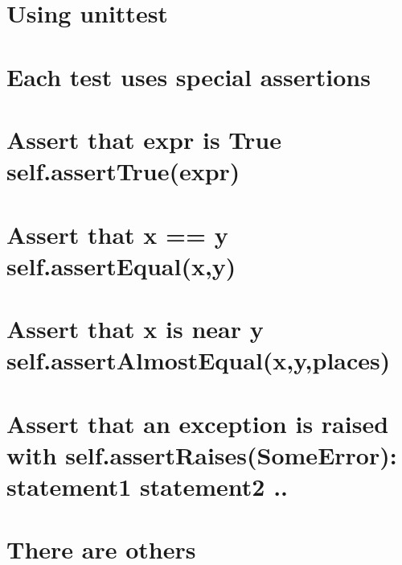 \documentclass[
  letterpaper,
  DIV=11,
  numbers=noendperiod]{scrreprt}
\begin{document}
\chapter{Using unittest}\label{using-unittest-2}


\chapter{Each test uses special
assertions}\label{each-test-uses-special-assertions}


\chapter{Assert that expr is True
self.assertTrue(expr)}\label{assert-that-expr-is-true-self.asserttrueexpr}


\chapter{Assert that x == y
self.assertEqual(x,y)}\label{assert-that-x-y-self.assertequalxy}


\chapter{Assert that x is near y
self.assertAlmostEqual(x,y,places)}\label{assert-that-x-is-near-y-self.assertalmostequalxyplaces}


\chapter{Assert that an exception is raised with
self.assertRaises(SomeError): statement1 statement2
..}\label{assert-that-an-exception-is-raised-with-self.assertraisessomeerror-statement1-statement2-..}


\chapter{There are others}\label{there-are-others}

\end{document}
